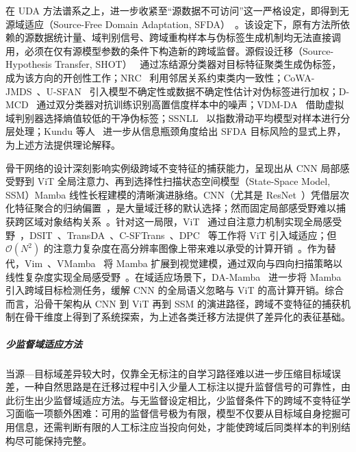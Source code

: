 在 UDA 方法谱系之上，进一步收紧至“源数据不可访问”这一严格设定，即得到无源域适应（Source-Free Domain Adaptation, SFDA）~\cite{liang2021source}。该设定下，原有方法所依赖的源数据统计量、域判别信号、跨域重构样本与伪标签生成机制均无法直接调用，必须在仅有源模型参数的条件下构造新的跨域监督。源假设迁移（Source-Hypothesis Transfer, SHOT）~\cite{liang2021source} 通过冻结源分类器对目标特征聚类生成伪标签，成为该方向的开创性工作；NRC~\cite{yang2021neighbor} 利用邻居关系约束类内一致性；CoWA-JMDS~\cite{cowa}、U-SFAN~\cite{U-SFAN} 引入模型不确定性或数据不确定性估计对伪标签进行加权；D-MCD~\cite{chu2022denoised} 通过双分类器对抗训练识别高置信度样本中的噪声；VDM-DA~\cite{tian2022vdm} 借助虚拟域判别器选择熵值较低的干净伪标签；SSNLL~\cite{chen2022self} 以指数滑动平均模型对样本进行分层处理；Kundu 等人~\cite{kundu2022towards} 进一步从信息瓶颈角度给出 SFDA 目标风险的显式上界，为上述方法提供理论解释。


骨干网络的设计深刻影响实例级跨域不变特征的捕获能力，呈现出从 CNN 局部感受野到 ViT 全局注意力、再到选择性扫描状态空间模型（State-Space Model, SSM）Mamba 线性长程建模的清晰演进脉络。CNN（尤其是 ResNet~\cite{he2016deep}）凭借层次化特征聚合的归纳偏置~\cite{yang2021neighbor,xia2021adaptive,zhang2024nami}，是大量域迁移的默认选择；然而固定局部感受野难以捕获跨区域对象结构关系~\cite{long2015learning,ganin2016domain}。针对这一局限，ViT~\cite{dosovitskiy2021image} 通过自注意力机制实现全局感受野~\cite{sanyal2023stable,xia2024dual}，DSIT~\cite{sanyal2023dsit}、TransDA~\cite{TransDA}、C-SFTrans~\cite{sanyal2024aligning}、DPC~\cite{dpc} 等工作将 ViT 引入域适应；但 $\mathcal{O}(N^2)$ 的注意力复杂度在高分辨率图像上带来难以承受的计算开销~\cite{zhu2024vision}。作为替代，Vim~\cite{zhu2024vision}、VMamba~\cite{vmamba} 将 Mamba 扩展到视觉建模，通过双向与四向扫描策略以线性复杂度实现全局感受野~\cite{zhu2024vision,vmamba}。在域适应场景下，DA-Mamba~\cite{DA-Mamba} 进一步将 Mamba 引入跨域目标检测任务，缓解 CNN 的全局语义忽略与 ViT 的高计算开销。综合而言，沿骨干架构从 CNN 到 ViT 再到 SSM 的演进路径，跨域不变特征的捕获机制在骨干维度上得到了系统探索，为上述各类迁移方法提供了差异化的表征基础。

\subparagraph{少监督域适应方法}

当源—目标域差异较大时，仅靠全无标注的自学习路径难以进一步压缩目标域误差，一种自然思路是在迁移过程中引入少量人工标注以提升监督信号的可靠性，由此衍生出少监督域适应方法。与无监督设定相比，少监督条件下的跨域不变特征学习面临一项额外困难：可用的监督信号极为有限，模型不仅要从目标域自身挖掘可用信息，还需判断有限的人工标注应当投向何处，才能使跨域后同类样本的判别结构尽可能保持完整。


